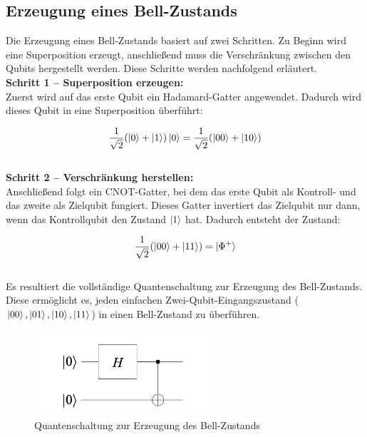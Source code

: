 \subsection{Erzeugung eines Bell-Zustands}
Die Erzeugung eines Bell-Zustands basiert auf zwei Schritten. Zu Beginn wird eine Superposition erzeugt, anschließend muss die Verschränkung zwischen den Qubits hergestellt werden. Diese Schritte werden nachfolgend erläutert.
\\


\textbf{Schritt 1 – Superposition erzeugen:} \\
Zuerst wird auf das erste Qubit ein Hadamard-Gatter angewendet. Dadurch wird dieses Qubit in eine Superposition überführt:

\[
\frac{1}{\sqrt{2}} (\ket{0} + \ket{1}) \ket{0} = \frac{1}{\sqrt{2}} (\ket{00} + \ket{10})
\]
\\


\textbf{Schritt 2 – Verschränkung herstellen:} \\
Anschließend folgt ein CNOT-Gatter, bei dem das erste Qubit als Kontroll- und das zweite als Zielqubit fungiert. Dieses Gatter invertiert das Zielqubit nur dann, wenn das Kontrollqubit den Zustand \(\ket{1}\) hat. Dadurch entsteht der Zustand:

\[
\frac{1}{\sqrt{2}} (\ket{00} + \ket{11}) = \ket{\Phi^+}
\]
\\


Es resultiert die vollständige Quantenschaltung zur Erzeugung des Bell-Zustands. Diese ermöglicht es, jeden einfachen Zwei-Qubit-Eingangszustand (\(\ket{00}, \ket{01}, \ket{10}, \ket{11}\)) in einen Bell-Zustand zu überführen.

\begin{figure}[h]
  \centering
  \includegraphics[width=0.6\textwidth]{images/quantum-information/aaf.png}
  \caption{Quantenschaltung zur Erzeugung des Bell-Zustands}
\end{figure}


